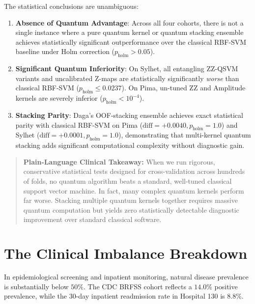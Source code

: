 \documentclass[journal,twocolumn]{IEEEtran}
\begin{document}
The statistical conclusions are unambiguous:
\begin{enumerate}
    \item \textbf{Absence of Quantum Advantage}: Across all four cohorts, there is not a single instance where a pure quantum kernel or quantum stacking ensemble achieves statistically significant outperformance over the classical RBF-SVM baseline under Holm correction ($p_{\text{holm}} > 0.05$).
    \item \textbf{Significant Quantum Inferiority}: On Sylhet, all entangling ZZ-QSVM variants and uncalibrated Z-maps are statistically significantly \emph{worse} than classical RBF-SVM ($p_{\text{holm}} \le 0.0237$). On Pima, un-tuned ZZ and Amplitude kernels are severely inferior ($p_{\text{holm}} < 10^{-4}$).
    \item \textbf{Stacking Parity}: Daga's OOF-stacking ensemble achieves exact statistical parity with classical RBF-SVM on Pima ($\text{diff} = +0.0040, p_{\text{holm}} = 1.0$) and Sylhet ($\text{diff} = +0.0001, p_{\text{holm}} = 1.0$), demonstrating that multi-kernel quantum stacking adds significant computational complexity without diagnostic gain.
\end{enumerate}

\begin{quote}
\small
\textbf{Plain-Language Clinical Takeaway:} When we run rigorous, conservative statistical tests designed for cross-validation across hundreds of folds, no quantum algorithm beats a standard, well-tuned classical support vector machine. In fact, many complex quantum kernels perform far worse. Stacking multiple quantum kernels together requires massive quantum computation but yields zero statistically detectable diagnostic improvement over standard classical software.
\end{quote}

\section{The Clinical Imbalance Breakdown}
\label{sec:imbalance}

In epidemiological screening and inpatient monitoring, natural disease prevalence is substantially below $50\%$. The CDC BRFSS cohort reflects a $14.0\%$ positive prevalence, while the 30-day inpatient readmission rate in Hospital 130 is $8.8\%$.
\end{document}

